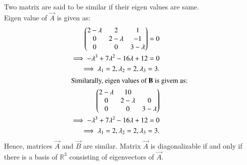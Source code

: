Two matrix are said to be similar if their eigen values are same.\\ Eigen value of $\vec{A}$ is given as:
\begin{align}
 \begin{pmatrix}2 - \lambda & 2 & 1 \\0 & 2-\lambda & -1 \\ 0 & 0 & 3-\lambda\end{pmatrix} = 0\\
 \implies -{\lambda}^3+7{\lambda}^2 -16\lambda +12 = 0\\
\implies \lambda_1  = 2, \lambda_2 = 2, \lambda_3 = 3. \label{eq:solutions/2015/dec/78/2.3}\\
 \intertext{Similarally, eigen values of $\mathbf{B}$ is givem as:}
\begin{pmatrix}2 - \lambda & 1 0 \\ 0 & 2 - \lambda & 0 \\ 0 & 0 & 3 - \lambda\end{pmatrix}\\
\implies -{\lambda}^3+7{\lambda}^2 -16\lambda +12 = 0\\
\implies \lambda_1  = 2, \lambda_2 = 2, \lambda_3 = 3.
\end{align}
Hence, matrices  $\vec{A}$ and $\vec{B}$ are similar.
Matrix $\vec{A}$ is diagonalizable if and only if there is a basis of $\mathbb{R}^3$ consisting of eigenvectors of $\vec{A}$.

